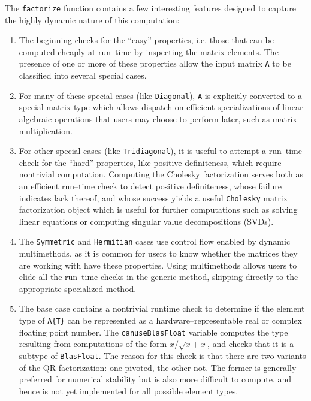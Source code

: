 \documentclass[pldi]{sigplanconf-pldi15}
\begin{document}
The \verb|factorize| function contains a few interesting features
designed to capture the highly dynamic nature of this computation:

\begin{enumerate}
\item The beginning checks for the ``easy'' properties, i.e.  those that can be
	computed cheaply at run--time by inspecting the matrix elements. The
	presence of one or more of these properties allow the input matrix
	\verb|A| to be classified into several special cases.

\item For many of these special cases (like \verb|Diagonal|), \verb|A| is
	explicitly converted to a special matrix type which allows dispatch on
	efficient specializations of linear algebraic operations that users may
	choose to perform later, such as matrix multiplication.
	
\item For other special cases (like \verb|Tridiagonal|), it is useful to
	attempt a run--time check for the ``hard'' properties, like positive
	definiteness, which require nontrivial computation. Computing the
	Cholesky factorization serves both as an efficient run--time check to
	detect positive definiteness, whose failure indicates lack thereof, and
	whose success yields a useful \verb|Cholesky| matrix factorization
	object which is useful for further computations such as solving linear
	equations or computing singular value decompositions (SVDs).

\item The \verb|Symmetric| and \verb|Hermitian| cases use control flow
	enabled by dynamic multimethods, as it is common for users to know
	whether the matrices they are working with have these properties.
	Using multimethods allows users to elide all the run--time checks
	in the generic method, skipping directly to the appropriate specialized
	method.

\item The base case contains a nontrivial runtime check to determine if the
	element type of \verb|A{T}| can be represented as a
	hardware--representable real or complex floating point number. The
	\verb|canuseBlasFloat| variable computes the type resulting from
	computations of the form $x / \sqrt{x + x}$, and checks that it is a
	subtype of \verb|BlasFloat|. The reason for this check is that there
	are two variants of the QR factorization: one pivoted, the other not.
	The former is generally preferred for numerical stability but is also
	more difficult to compute, and hence is not yet
	implemented for all possible element types.

\end{enumerate}
\end{document}

